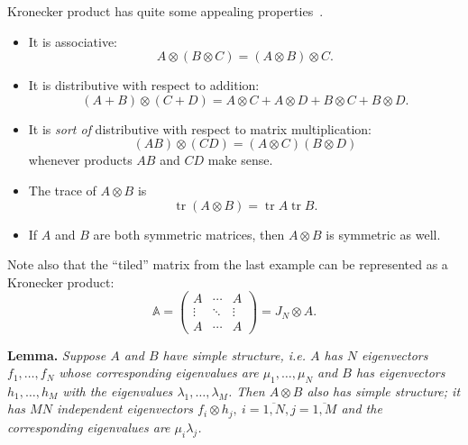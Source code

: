 \documentclass[a4paper]{jpconf}
\begin{document}
Kronecker product has quite some appealing properties~\cite{bellman-matrices-kron}.
\begin{itemize}
\item It is associative:
    \[ A\otimes (B\otimes C) = (A\otimes B)\otimes C. \]
\item It is distributive with respect to addition:
    \[ (A+B)\otimes(C+D) = A\otimes C + A\otimes D + B\otimes C + B\otimes D. \]
\item It is \emph{sort of} distributive with respect to matrix multiplication:
    \[ (AB)\otimes(CD) = (A\otimes C)(B\otimes D) \]
    whenever products \( AB \) and \( CD \) make sense.
\item The trace of \( A\otimes B \) is \[ \operatorname{tr}(A\otimes B) = \operatorname{tr}A\operatorname{tr}B. \]
\item If \( A \) and \( B \) are both symmetric matrices,
      then \( A\otimes B \) is symmetric as well.
\end{itemize}
Note also that the ``tiled'' matrix from the last example
    can be represented as a Kronecker product:
\[
    \mathbb{A} =
    \begin{pmatrix}
    A & \cdots & A\\
    \vdots & \ddots & \vdots \\
    A & \cdots & A\end{pmatrix} =
        J_N\otimes A.
    \]

\begin{center}
\textbf{Lemma.}
{\it
Suppose \( A \) and \( B \) have simple structure,
    i.e. \( A \) has \( N \) eigenvectors
    \( f_1, \ldots, f_N \)
    whose corresponding eigenvalues are \( \mu_1, \ldots, \mu_N \)
    and \( B \) has eigenvectors \( h_1, \ldots, h_M \)
    with the eigenvalues \( \lambda_1, \ldots, \lambda_M \).
Then \( A\otimes B \) also has simple structure;
    it has \( MN \) independent eigenvectors \( f_i\otimes h_j,\ i{=}\overline{1,N}, j{=}\overline{1,M} \)
    and the corresponding eigenvalues are \( \mu_i \lambda_j \).
\/}
\end{center}
\end{document}
